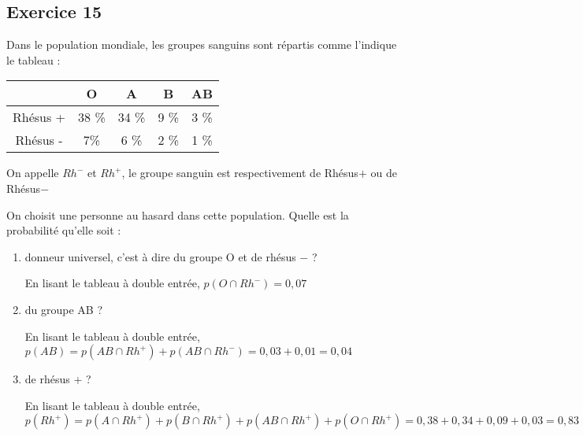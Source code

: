 \documentclass[openany]{book}
\begin{document}
\begin{minipage}{0.5\linewidth}
 
 
\subsection{Exercice 15}
 
 Dans le population mondiale, les groupes sanguins sont répartis comme l'indique le tableau :

\begin{tabular}{|c|c|c|c|c|}
\hline 
  & O & A & B & AB \\ 
\hline 
Rhésus + & 38 \% & 34 \% & 9 \% & 3 \% \\ 
\hline 
Rhésus - & 7\% & 6 \% & 2 \% & 1 \% \\ 
\hline 
\end{tabular} 

On appelle $Rh^-$ et $Rh^+$, le groupe sanguin est respectivement de Rhésus$+$ ou de Rhésus$-$


On choisit une personne au hasard dans cette population. Quelle est la probabilité qu'elle soit :
\begin{enumerate}
\item donneur universel, c'est à dire du groupe O et de rhésus $-$ ?

En lisant le tableau à double entrée, $p(O \cap Rh^-)=0,07$

\item du groupe AB ?

En lisant le tableau à double entrée, $p(AB)=p(AB \cap Rh^+)+p(AB \cap Rh^-) = 0,03+0,01 = 0,04$

\item de rhésus + ?

En lisant le tableau à double entrée, $$ p(Rh^+)= p(A \cap Rh^+)+p(B \cap Rh^+)+p(AB \cap Rh^+)+p(O \cap Rh^+) = 0,38+0,34 +0,09+0,03 = 0,83 $$


\end{enumerate}
 
 
 
 
 
\end{minipage}




\newpage
\end{document}
